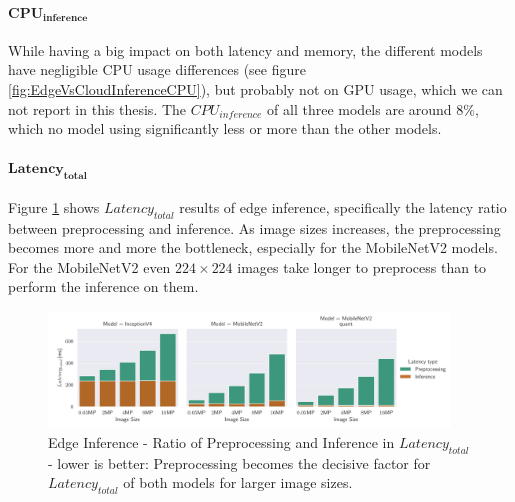 \paragraph{$\mathbf{CPU_{inference}}$}
While having a big impact on both latency and memory, the different models have 
negligible CPU usage differences (see figure \ref{fig:EdgeVsCloudInferenceCPU}), but probably not on GPU usage, which we can not report in this thesis.
The $CPU_{inference}$ of all three models are around $8\%$, which no model using significantly less or more than the other models.




\paragraph{$\mathbf{Latency_{total}}$}
Figure \ref{fig:EdgeInferenceRatio} shows $Latency_{total}$ results of edge inference, specifically the latency ratio between preprocessing and inference.
As image sizes increases, the preprocessing becomes more and more the bottleneck, especially for the MobileNetV2 models.
For the MobileNetV2 even $224\times224$ images take longer to preprocess than to perform the inference on them.
\begin{figure}[!htb]
\centering
\includegraphics[width=0.95\textwidth]{./Bilder/single_plots/edge_inference_plots/Edge_Preprocessing_+_Inference.pdf}
\caption[Edge Inference - Ratio of Preprocessing and Inference in $Latency_{total}$]{Edge Inference - Ratio of Preprocessing and Inference in $Latency_{total}$ - lower is better: Preprocessing becomes the decisive factor for $Latency_{total}$ of both models for larger image sizes.}
\label{fig:EdgeInferenceRatio}
\end{figure}


